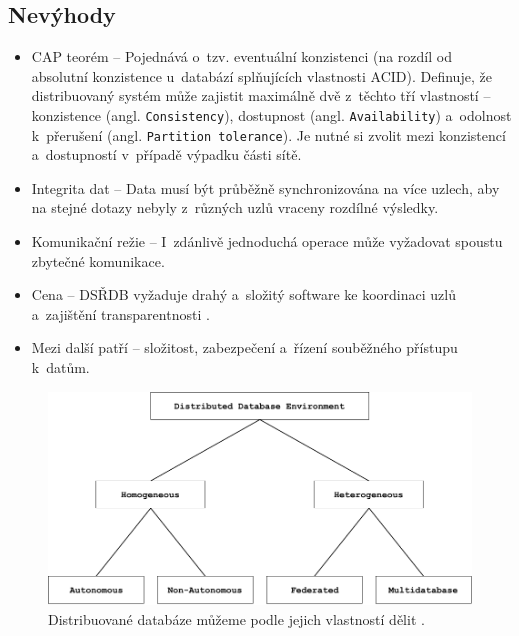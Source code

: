 \subsection{Nevýhody}
\begin{itemize}
\item CAP teorém -- Pojednává o~tzv. eventuální konzistenci (na rozdíl od absolutní konzistence u~databází splňujících vlastnosti ACID). Definuje, že distribuovaný systém může zajistit maximálně dvě z~těchto tří vlastností -- konzistence (angl. \texttt{Consistency}), dostupnost (angl. \texttt{Availability}) a~odolnost k~přerušení (angl. \texttt{Partition tolerance}). Je nutné si zvolit mezi konzistencí a~dostupností v~případě výpadku části sítě.

\item Integrita dat -- Data musí být průběžně synchronizována na více uzlech, aby na stejné dotazy nebyly z~různých uzlů vraceny rozdílné výsledky.

\item Komunikační režie -- I~zdánlivě jednoduchá operace může vyžadovat spoustu zbytečné komunikace.

\item Cena -- DSŘDB vyžaduje drahý a~složitý software ke koordinaci uzlů a~zajištění transparentnosti \cite{distributedDBMS}.

\item Mezi další patří -- složitost, zabezpečení a~řízení souběžného přístupu k~datům.
\end{itemize}

\begin{figure}[!h]
  \centering
  \includegraphics[width=15cm]{template-fig/DistributedDatabasesClassification.pdf}
  \caption{Distribuované databáze můžeme podle jejich vlastností dělit \cite{distributedDBMS}.}
  \label{FIG_DivDistrDB}
\end{figure}

